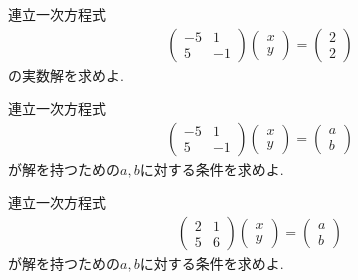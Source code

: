 \begin{quiz}
  \label{quiz:3:3x}

  連立一次方程式
  \begin{align*}
    \begin{pmatrix}-5&1\\5&-1\end{pmatrix}
    \begin{pmatrix}x\\y\end{pmatrix}
      =
      \begin{pmatrix}2\\2\end{pmatrix}
  \end{align*}
  の実数解を求めよ.
\end{quiz}

\begin{quiz}
  \label{quiz:3:4}
  連立一次方程式
  \begin{align*}
    \begin{pmatrix}-5&1\\5&-1\end{pmatrix}
    \begin{pmatrix}x\\y\end{pmatrix}
      =
      \begin{pmatrix}a\\b\end{pmatrix}
  \end{align*}
  が解を持つための$a,b$に対する条件を求めよ.
\end{quiz}

\begin{quiz}
  \label{quiz:3:4x}
  連立一次方程式
  \begin{align*}
    \begin{pmatrix}2&1\\5&6\end{pmatrix}
    \begin{pmatrix}x\\y\end{pmatrix}
      =
      \begin{pmatrix}a\\b\end{pmatrix}
  \end{align*}
  が解を持つための$a,b$に対する条件を求めよ.
\end{quiz}

